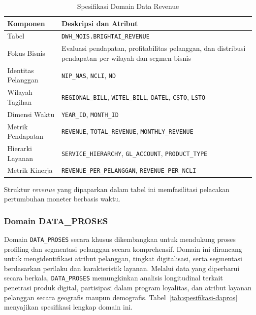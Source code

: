 \begin{table}[htbp]
\centering
\caption{Spesifikasi Domain Data Revenue}
\label{tab:spesifikasi-revenue}
\begin{tabular}{|p{4cm}|p{9cm}|}
\hline
\textbf{Komponen} & \textbf{Deskripsi dan Atribut} \\
\hline
Tabel & \texttt{DWH\_MOIS.BRIGHTAI\_REVENUE} \\
\hline
Fokus Bisnis & Evaluasi pendapatan, profitabilitas pelanggan, dan distribusi pendapatan per wilayah dan segmen bisnis \\
\hline
Identitas Pelanggan & \texttt{NIP\_NAS}, \texttt{NCLI}, \texttt{ND} \\
\hline
Wilayah Tagihan & \texttt{REGIONAL\_BILL}, \texttt{WITEL\_BILL}, \texttt{DATEL}, \texttt{CSTO}, \texttt{LSTO} \\
\hline
Dimensi Waktu & \texttt{YEAR\_ID}, \texttt{MONTH\_ID} \\
\hline
Metrik Pendapatan & \texttt{REVENUE}, \texttt{TOTAL\_REVENUE}, \texttt{MONTHLY\_REVENUE} \\
\hline
Hierarki Layanan & \texttt{SERVICE\_HIERARCHY}, \texttt{GL\_ACCOUNT}, \texttt{PRODUCT\_TYPE} \\
\hline
Metrik Kinerja & \texttt{REVENUE\_PER\_PELANGGAN}, \texttt{REVENUE\_PER\_NCLI} \\
\hline
\end{tabular}
\end{table}

Struktur \textit{revenue} yang dipaparkan dalam tabel ini memfasilitasi pelacakan pertumbuhan moneter berbasis waktu.

\subsubsection{Domain DATA\_PROSES}

Domain \texttt{DATA\_PROSES} secara khusus dikembangkan untuk mendukung proses profiling dan segmentasi pelanggan secara komprehensif. Domain ini dirancang untuk mengidentifikasi atribut pelanggan, tingkat digitalisasi, serta segmentasi berdasarkan perilaku dan karakteristik layanan. Melalui data yang diperbarui secara berkala, \texttt{DATA\_PROSES} memungkinkan analisis longitudinal terkait penetrasi produk digital, partisipasi dalam program loyalitas, dan atribut layanan pelanggan secara geografis maupun demografis. Tabel~\ref{tab:spesifikasi-dapros} menyajikan spesifikasi lengkap domain ini.

